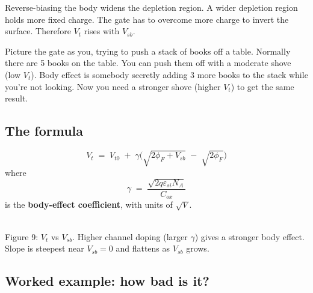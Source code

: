 \documentclass[11pt]{article}
\begin{document}
\begin{keyidea}
Reverse-biasing the body widens the depletion region. A wider depletion region holds more fixed charge. The gate has to overcome more charge to invert the surface. Therefore $V_t$ rises with $V_{sb}$.
\end{keyidea}

\begin{hook}
Picture the gate as you, trying to push a stack of books off a table. Normally there are 5 books on the table. You can push them off with a moderate shove (low $V_t$). Body effect is somebody secretly adding 3 more books to the stack while you're not looking. Now you need a stronger shove (higher $V_t$) to get the same result.
\end{hook}

\subsection{The formula}

\begin{equation}
\boxed{V_t \;=\; V_{t0} \;+\; \gamma\Big(\sqrt{2\phi_F + V_{sb}} \;-\; \sqrt{2\phi_F}\Big)}
\end{equation}
where
\begin{equation}
\gamma \;=\; \frac{\sqrt{2q\varepsilon_{si}N_A}}{C_{ox}}
\end{equation}
is the \textbf{body-effect coefficient}, with units of $\sqrt{V}$.

\begin{center}
\\
{\small Figure 9: $V_t$ vs $V_{sb}$. Higher channel doping (larger $\gamma$) gives a stronger body effect. Slope is steepest near $V_{sb}=0$ and flattens as $V_{sb}$ grows.}
\end{center}

\subsection{Worked example: how bad is it?}
\end{document}
